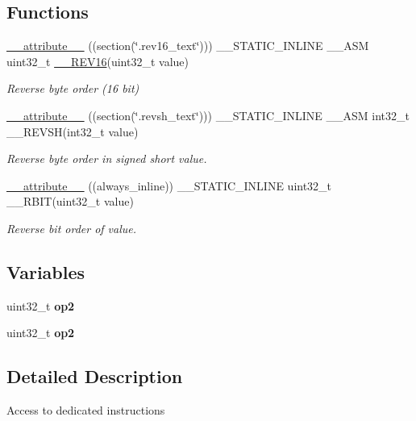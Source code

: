 \subsection*{Functions}
\begin{DoxyCompactItemize}
\item 
\hyperlink{group___c_m_s_i_s___core___instruction_interface_gae84a2733711339c5eefeb0d899506b96}{\+\_\+\+\_\+attribute\+\_\+\+\_\+} ((section(\char`\"{}.rev16\+\_\+text\char`\"{}))) \+\_\+\+\_\+\+S\+T\+A\+T\+I\+C\+\_\+\+I\+N\+L\+I\+NE \+\_\+\+\_\+\+A\+SM uint32\+\_\+t \hyperlink{group___c_m_s_i_s___core___instruction_interface_ga4e3acd41e7667cdf65ffcd8c76a8613f}{\+\_\+\+\_\+\+R\+E\+V16}(uint32\+\_\+t value)
\begin{DoxyCompactList}\small\item\em Reverse byte order (16 bit) \end{DoxyCompactList}\item 
\hyperlink{group___c_m_s_i_s___core___instruction_interface_ga8e7a866927d3257a82b884ad14dbef4c}{\+\_\+\+\_\+attribute\+\_\+\+\_\+} ((section(\char`\"{}.revsh\+\_\+text\char`\"{}))) \+\_\+\+\_\+\+S\+T\+A\+T\+I\+C\+\_\+\+I\+N\+L\+I\+NE \+\_\+\+\_\+\+A\+SM int32\+\_\+t \+\_\+\+\_\+\+R\+E\+V\+SH(int32\+\_\+t value)
\begin{DoxyCompactList}\small\item\em Reverse byte order in signed short value. \end{DoxyCompactList}\item 
\hyperlink{group___c_m_s_i_s___core___instruction_interface_gab926fe7178a379c3a7c0410b06fcb661}{\+\_\+\+\_\+attribute\+\_\+\+\_\+} ((always\+\_\+inline)) \+\_\+\+\_\+\+S\+T\+A\+T\+I\+C\+\_\+\+I\+N\+L\+I\+NE uint32\+\_\+t \+\_\+\+\_\+\+R\+B\+IT(uint32\+\_\+t value)
\begin{DoxyCompactList}\small\item\em Reverse bit order of value. \end{DoxyCompactList}\end{DoxyCompactItemize}
\subsection*{Variables}
\begin{DoxyCompactItemize}
\item 
uint32\+\_\+t {\bfseries op2}
\item 
uint32\+\_\+t {\bfseries op2}
\end{DoxyCompactItemize}


\subsection{Detailed Description}
Access to dedicated instructions 

